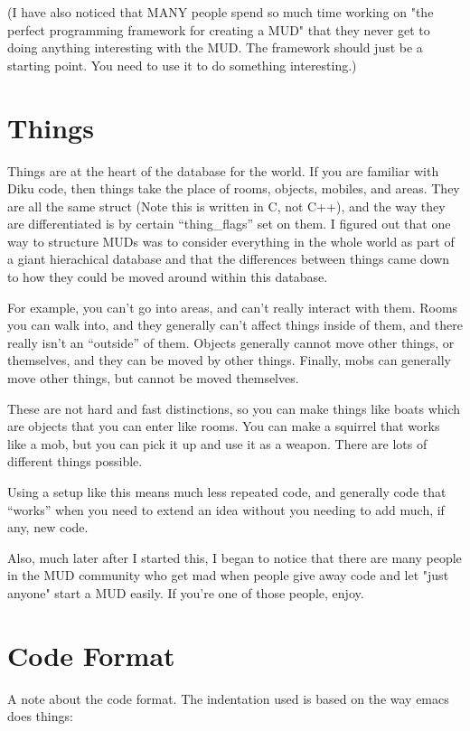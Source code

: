 (I have also noticed that MANY people spend so much time working on
"the perfect programming framework for creating a MUD" that they
never get to doing anything interesting with the MUD. The framework
should just be a starting point. You need to use it to do something
interesting.)

\section{Things}

Things are at the heart of the database for the world. If you are
familiar with Diku code, then things take the place of rooms, objects,
mobiles, and areas. They are all the same struct (Note this is written
in C, not C++), and the way they are differentiated is by certain
``thing\_flags'' set on them. I figured out that one way to structure
MUDs was to consider everything in the whole world as part of a giant
hierachical database and that the differences between things came down
to how they could be moved around within this database.

For example, you can't go into areas, and can't really interact with
them. Rooms you can walk into, and they generally can't affect things
inside of them, and there really isn't an ``outside'' of them. Objects
generally cannot move other things, or themselves, and they can be
moved by other things. Finally, mobs can generally move other things,
but cannot be moved themselves.

These are not hard and fast distinctions, so you can make things like
boats which are objects that you can enter like rooms. You can make a
squirrel that works like a mob, but you can pick it up and use it as a
weapon. There are lots of different things possible.

Using a setup like this means much less repeated code, and generally
code that ``works'' when you need to extend an idea without you
needing to add much, if any, new code.

Also, much later after I started this, I began to notice that
there are many people in the MUD community who get mad when people
give away code and let "just anyone" start a MUD easily. If you're
one of those people, enjoy.

\section{Code Format}

A note about the code format. The indentation used is based on the way emacs does things: 


